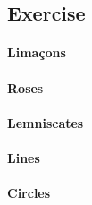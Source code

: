 \subsection{Exercise}

\paragraph{Lima\c{c}ons}
\paragraph{Roses}
\paragraph{Lemniscates}
\paragraph{Lines}
\paragraph{Circles}




\newpage
{}
\noindent{}
